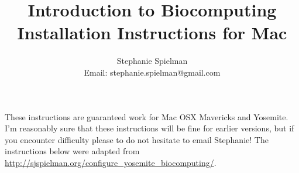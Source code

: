 \documentclass{article}
\begin{document}
\title{Introduction to Biocomputing \\ Installation Instructions for Mac}
\author{Stephanie Spielman \\ \footnotesize{Email: stephanie.spielman@gmail.com}}
\date{}
\maketitle{}

These instructions are guaranteed work for Mac OSX Mavericks and Yosemite. I'm reasonably sure that these instructions will be fine for earlier versions, but if you encounter difficulty please to do not hesitate to email Stephanie! The instructions below were adapted from \href{http://sjspielman.org/configure_yosemite_biocomputing/}
{http://sjspielman.org/configure\_yosemite\_biocomputing/}.
\end{document}
